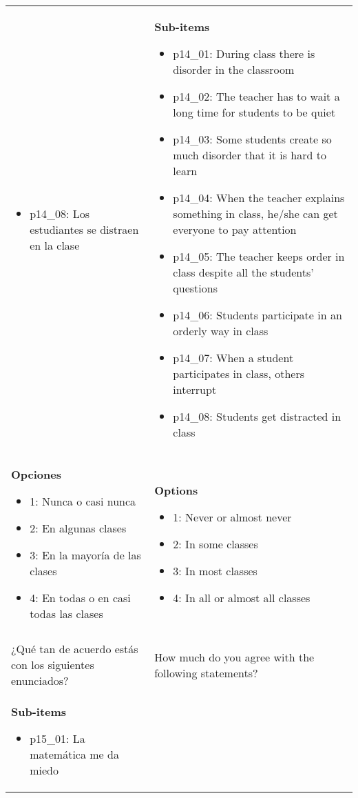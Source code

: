 \documentclass[11pt]{article}
\begin{document}
\begin{longtable}{@{}LL@{}}
\begin{itemize}[leftmargin=*]
\item p14\_08: Los estudiantes se distraen en la clase\end{itemize} & \textbf{Sub-items}\par\begin{itemize}[leftmargin=*]\item p14\_01: During class there is disorder in the classroom
\item p14\_02: The teacher has to wait a long time for students to be quiet
\item p14\_03: Some students create so much disorder that it is hard to learn
\item p14\_04: When the teacher explains something in class, he/she can get everyone to pay attention
\item p14\_05: The teacher keeps order in class despite all the students' questions
\item p14\_06: Students participate in an orderly way in class
\item p14\_07: When a student participates in class, others interrupt
\item p14\_08: Students get distracted in class\end{itemize} \\
\textbf{Opciones}\par\begin{itemize}[leftmargin=*]\item 1: Nunca o casi nunca
\item 2: En algunas clases
\item 3: En la mayoría de las clases
\item 4: En todas o en casi todas las clases\end{itemize} & \textbf{Options}\par\begin{itemize}[leftmargin=*]\item 1: Never or almost never
\item 2: In some classes
\item 3: In most classes
\item 4: In all or almost all classes\end{itemize} \\
\addlinespace[4pt]
 \\ 
¿Qué tan de acuerdo estás con los siguientes enunciados? & How much do you agree with the following statements? \\
\textbf{Sub-items}\par\begin{itemize}[leftmargin=*]\item p15\_01: La matemática me da miedo

\end{itemize}
\end{longtable}
\end{document}
